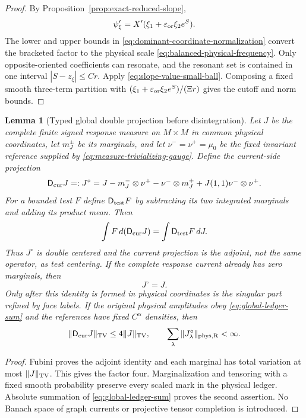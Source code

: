 \documentclass[11pt]{article}
\newtheorem{lemma}[theorem]{Lemma}
\begin{document}
\begin{proof}
By Proposition~\ref{prop:exact-reduced-slope},
\[
 \psi_\xi'=X'(\xi_1+\varepsilon_{\rm or}\xi_2e^S).
\]
The lower and upper bounds in
\eqref{eq:dominant-coordinate-normalization} convert the bracketed factor to
the physical scale \eqref{eq:balanced-physical-frequency}.  Only
opposite-oriented coefficients can resonate, and the resonant set is
contained in one interval $|S-z_\xi|\le Cr$.  Apply
\eqref{eq:slope-value-small-ball}.  Composing a fixed smooth three-term
partition with
$(\xi_1+\varepsilon_{\rm or}\xi_2e^S)/(\Xi r)$ gives the cutoff and norm
bounds.
\end{proof}
\begin{lemma}[Typed global double projection before disintegration]
\label{lem:global-label-recentering}
Let $J$ be the complete finite signed response measure on $M\times M$ in
common physical coordinates, let $m_J^\pm$ be its marginals, and let
$\nu^-=\nu^+=\mu_0$ be the fixed invariant reference supplied by
\eqref{eq:measure-trivializing-gauge}.  Define the
current-side projection
\begin{equation}
\label{eq:labelwise-recentering}
 \mathsf D_{\rm cur}J=:J^\circ
 =J-m_J^-\otimes\nu^+-\nu^-\otimes m_J^+
   +J(1,1)\nu^-\otimes\nu^+.
\end{equation}
For a bounded test $F$ define $\mathsf D_{\rm test}F$ by subtracting its two
integrated marginals and adding its product mean.  Then
\[
 \int F\,d(\mathsf D_{\rm cur}J)=
 \int \mathsf D_{\rm test}F\,dJ.
\]
Thus $J^\circ$ is double centered and the current projection is the adjoint,
not the same operator, as test centering.  If the complete response current
already has zero marginals, then
\begin{equation}
\label{eq:global-recentering-sum}
 J^\circ=J.
\end{equation}
Only after this identity is formed in physical coordinates is the singular
part refined by face labels.  If the original physical amplitudes obey
\eqref{eq:global-ledger-sum} and the references have fixed $C^\alpha$
densities, then
\begin{equation}
\label{eq:recenter-norm-ledger}
 \|\mathsf D_{\rm cur}J\|_{\rm TV}
 \le4\|J\|_{\rm TV},\qquad
 \sum_\lambda\|J_\lambda^\circ\|_{\rm phys,R}<\infty .
\end{equation}
\end{lemma}

\begin{proof}
Fubini proves the adjoint identity and each marginal has total variation at
most $\|J\|_{\rm TV}$.  This gives the factor four.  Marginalization and
tensoring with a fixed smooth probability preserve every scaled mark in the
physical ledger.  Absolute summation of \eqref{eq:global-ledger-sum} proves
the second assertion.  No Banach space of graph currents or projective tensor
completion is introduced.
\end{proof}
\end{document}
